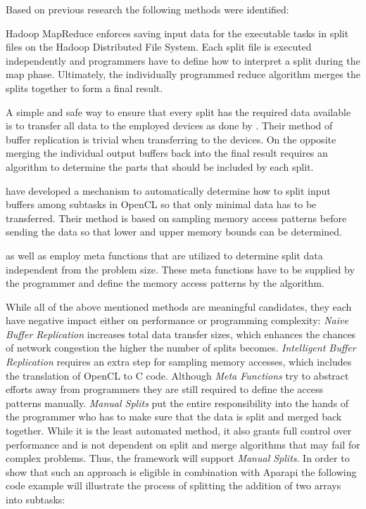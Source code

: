 Based on previous research the following methods were identified:

\begin{description}[style=nextline]
	\item [Manual Splits]
	Hadoop MapReduce enforces saving input data for the executable tasks in split files on the Hadoop Distributed File System. Each split file is executed independently and programmers have to define how to interpret a split during the map phase. Ultimately, the individually programmed reduce algorithm merges the splits together to form a final result.
	
	\item [Naive Buffer Replication]
	A simple and safe way to ensure that every split has the required data available is to transfer all data to the employed devices as done by \citeauthor{delalama_2012}\cite{delalama_2012}. Their method of buffer replication is trivial when transferring to the devices. On the opposite merging the individual output buffers back into the final result requires an algorithm to determine the parts that should be included by each split.
	
	\item [Intelligent Buffer Replication]
	\citeauthor{Kim_2011}\cite{Kim_2011} have developed a mechanism to automatically determine how to split input buffers among subtasks in OpenCL so that only minimal data has to be transferred. Their method is based on sampling memory access patterns before sending the data so that lower and upper memory bounds can be determined.
		
	\item [Meta Functions]
	\citeauthor{stepocl}\cite{stepocl} as well as \citeauthor{distcl}\cite{distcl} employ meta functions that are utilized to determine split data independent from the problem size. These meta functions have to be supplied by the programmer and define the memory access patterns by the algorithm.
	
\end{description} 

While all of the above mentioned methods are meaningful candidates, they each have negative impact either on performance or programming complexity: \textit{Naive Buffer Replication} increases total data transfer sizes, which enhances the chances of network congestion the higher the number of splits becomes. \textit{Intelligent Buffer Replication} requires an extra step for sampling memory accesses, which includes the translation of OpenCL to C code. Although \textit{Meta Functions} try to abstract efforts away from programmers they are still required to define the access patterns manually. \textit{Manual Splits} put the entire responsibility into the hands of the programmer who has to make sure that the data is split and merged back together. While it is the least automated method, it also grants full control over performance and is not dependent on split and merge algorithms that may fail for complex problems. Thus, the framework will support \textit{Manual Splits}. In order to show that such an approach is eligible in combination with Aparapi the following code example will illustrate the process of splitting the addition of two arrays into subtasks:

